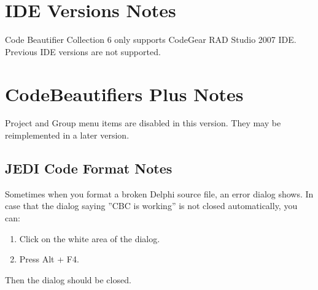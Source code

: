 \chapter{IDE Versions Notes}
Code Beautifier Collection 6 only supports CodeGear RAD Studio 2007 IDE.
Previous IDE versions are not supported.
% 

\chapter{CodeBeautifiers Plus Notes}
Project and Group menu items are disabled in this version. They may be
reimplemented in a later version.


\section{JEDI Code Format Notes}
Sometimes when you format a broken Delphi source file, an error dialog shows.
In case that the dialog saying ''CBC is working'' is not closed automatically,
you can:
\begin{enumerate}
  \item Click on the white area of the dialog.
  \item Press Alt + F4.
\end{enumerate}
Then the dialog should be closed.

